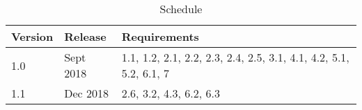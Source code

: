\begin{table}[hbt!]                    
  \centering
\begin{adjustbox}{max width=\textwidth}            
  \begin{tabular}{lll}                    
    \toprule          
      Version & 	Release	 & Requirements \\  \hline
      1.0	& Sept 2018 &	1.1, 1.2, 2.1, 2.2, 2.3, 2.4, 2.5, 3.1, 4.1, 4.2, 5.1, 5.2, 6.1, 7\\  \hline
      1.1	 & Dec 2018 &	2.6, 3.2, 4.3, 6.2, 6.3\\  \hline                            
  \end{tabular}
\end{adjustbox}
  \caption{Schedule}             
  \label{tab:schedule}                 
\end{table}
